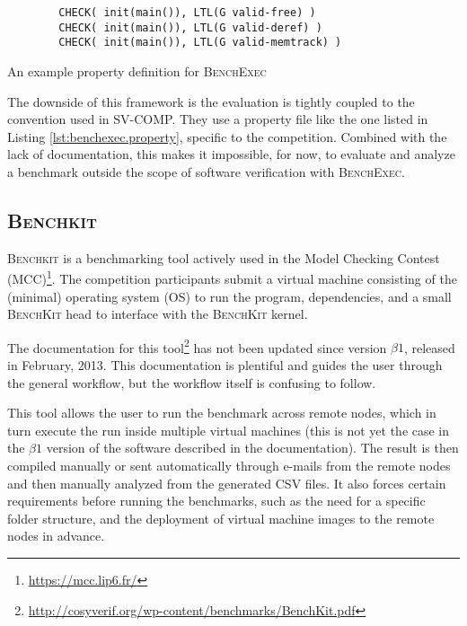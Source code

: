 \begin{listing}
	\begin{verbatim}
		CHECK( init(main()), LTL(G valid-free) )
		CHECK( init(main()), LTL(G valid-deref) )
		CHECK( init(main()), LTL(G valid-memtrack) )
	\end{verbatim}
	\caption{An example property definition for \textsc{BenchExec}}
	\label{lst:benchexec.property}
\end{listing}

The downside of this framework is the evaluation is tightly coupled to the convention used in SV-COMP.
They use a property file like the one listed in Listing \ref{lst:benchexec.property}, specific to the competition.
Combined with the lack of documentation, this makes it impossible, for now, to evaluate and analyze a benchmark outside the scope of software verification with \textsc{BenchExec}.


\subsection{\textsc{Benchkit}}

\textsc{Benchkit} \citep{benchkit:2013} is a benchmarking tool actively used in the Model Checking Contest (MCC)\footnote{\href{https://mcc.lip6.fr/}{https://mcc.lip6.fr/}}.
The competition participants submit a virtual machine consisting of the (minimal) operating system (OS) to run the program, dependencies, and a small \textsc{BenchKit} head to interface with the \textsc{BenchKit} kernel.

The documentation for this tool\footnote{\href{http://cosyverif.org/wp-content/benchmarks/BenchKit.pdf}{http://cosyverif.org/wp-content/benchmarks/BenchKit.pdf}} has not been updated since version $\beta1$, released in February, 2013.
This documentation is plentiful and guides the user through the general workflow, but the workflow itself is confusing to follow.

This tool allows the user to run the benchmark across remote nodes, which in turn execute the run inside multiple virtual machines (this is not yet the case in the $\beta1$ version of the software described in the documentation).
The result is then compiled manually or sent automatically through e-mails from the remote nodes and then manually analyzed from the generated CSV files.
It also forces certain requirements before running the benchmarks, such as the need for a specific folder structure, and the deployment of virtual machine images to the remote nodes in advance.

